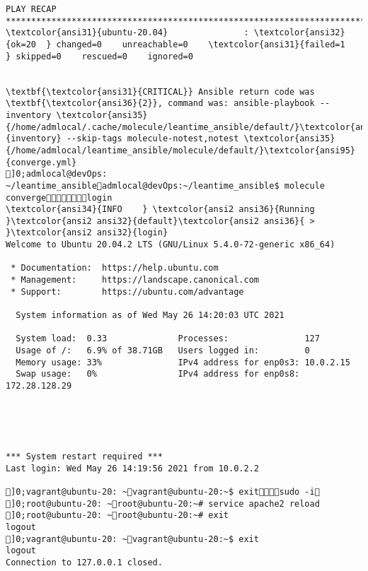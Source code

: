 \documentclass{scrartcl}
\begin{document}
\begin{Verbatim}
PLAY RECAP *******************************************************************************************************************************
\textcolor{ansi31}{ubuntu-20.04}               : \textcolor{ansi32}{ok=20  } changed=0    unreachable=0    \textcolor{ansi31}{failed=1   } skipped=0    rescued=0    ignored=0


\textbf{\textcolor{ansi31}{CRITICAL}} Ansible return code was \textbf{\textcolor{ansi36}{2}}, command was: ansible-playbook --inventory \textcolor{ansi35}{/home/admlocal/.cache/molecule/leantime_ansible/default/}\textcolor{ansi95}{inventory} --skip-tags molecule-notest,notest \textcolor{ansi35}{/home/admlocal/leantime_ansible/molecule/default/}\textcolor{ansi95}{converge.yml}
]0;admlocal@devOps: ~/leantime_ansibleadmlocal@devOps:~/leantime_ansible$ molecule convergelogin
\textcolor{ansi34}{INFO    } \textcolor{ansi2 ansi36}{Running }\textcolor{ansi2 ansi32}{default}\textcolor{ansi2 ansi36}{ > }\textcolor{ansi2 ansi32}{login}
Welcome to Ubuntu 20.04.2 LTS (GNU/Linux 5.4.0-72-generic x86_64)

 * Documentation:  https://help.ubuntu.com
 * Management:     https://landscape.canonical.com
 * Support:        https://ubuntu.com/advantage

  System information as of Wed May 26 14:20:03 UTC 2021

  System load:  0.33              Processes:               127
  Usage of /:   6.9% of 38.71GB   Users logged in:         0
  Memory usage: 33%               IPv4 address for enp0s3: 10.0.2.15
  Swap usage:   0%                IPv4 address for enp0s8: 172.28.128.29





*** System restart required ***
Last login: Wed May 26 14:19:56 2021 from 10.0.2.2

]0;vagrant@ubuntu-20: ~vagrant@ubuntu-20:~$ exitsudo -i
]0;root@ubuntu-20: ~root@ubuntu-20:~# service apache2 reload
]0;root@ubuntu-20: ~root@ubuntu-20:~# exit
logout
]0;vagrant@ubuntu-20: ~vagrant@ubuntu-20:~$ exit
logout
Connection to 127.0.0.1 closed.


\end{Verbatim}
\end{document}
